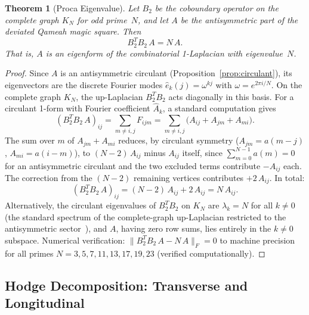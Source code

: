 \documentclass[aip,jmp,reprint,superscriptaddress,floatfix,nofootinbib]{revtex4-2}
\newtheorem{theorem}{Theorem}
\theoremstyle{definition}
\theoremstyle{remark}
\begin{document}
\begin{theorem}[Proca Eigenvalue]\label{thm:proca}
Let $B_2$ be the coboundary operator on the complete graph $K_N$ for
odd prime~$N$, and let $A$ be the antisymmetric part of the deviated
Qameah magic square.  Then
\begin{equation}\label{eq:proca}
B_2^T B_2\, A = N\, A.
\end{equation}
That is, $A$ is an eigenform of the combinatorial 1-Laplacian with
eigenvalue~$N$.
\end{theorem}

\begin{proof}
Since $A$ is an antisymmetric circulant (Proposition~\ref{prop:circulant}),
its eigenvectors are the discrete Fourier modes
$\hat{e}_k(j) = \omega^{kj}$ with $\omega = e^{2\pi i/N}$.  On the
complete graph $K_N$, the up-Laplacian $B_2^T B_2$ acts diagonally
in this basis.  For a circulant 1-form with Fourier coefficient
$\hat{A}_k$, a standard computation gives
\begin{equation}\label{eq:lap-eigenvalue}
(B_2^T B_2\, A)_{ij}
  = \sum_{m \ne i,j} F_{ijm}
  = \sum_{m \ne i,j}\bigl(A_{ij} + A_{jm} + A_{mi}\bigr).
\end{equation}
The sum over $m$ of $A_{jm} + A_{mi}$ reduces, by circulant
symmetry ($A_{jm} = a(m{-}j)$, $A_{mi} = a(i{-}m)$), to
$(N{-}2)\, A_{ij}$ minus $A_{ij}$ itself, since
$\sum_{m=0}^{N-1} a(m) = 0$ for an antisymmetric circulant and the
two excluded terms contribute $-A_{ij}$ each.  The correction from
the $(N{-}2)$ remaining vertices contributes $+2\,A_{ij}$.  In total:
\begin{equation}
(B_2^T B_2\, A)_{ij} = (N{-}2)\, A_{ij} + 2\, A_{ij} = N\, A_{ij}.
\end{equation}
Alternatively, the circulant eigenvalues of $B_2^T B_2$ on $K_N$
are $\lambda_k = N$ for all $k \ne 0$ (the standard spectrum of the
complete-graph up-Laplacian restricted to the antisymmetric
sector~\cite{Eckmann1945}), and $A$, having zero row sums, lies
entirely in the $k \ne 0$ subspace.  Numerical verification:
$\|B_2^T B_2\, A - N\, A\|_F = 0$ to machine precision for all
primes $N = 3, 5, 7, 11, 13, 17, 19, 23$ (verified computationally).
\end{proof}

\subsection{Hodge Decomposition: Transverse and Longitudinal}
\label{sec:proca:physical}
\end{document}
